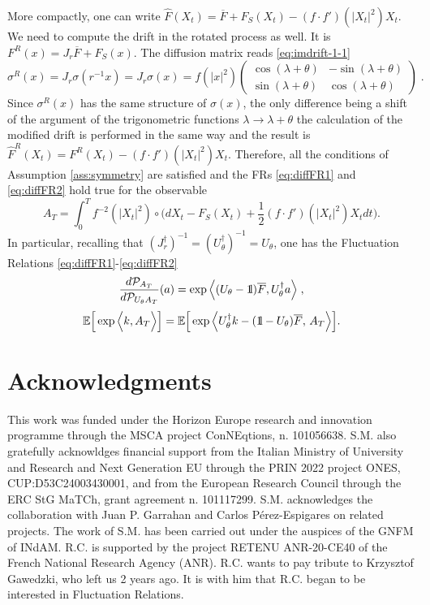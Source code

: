 \documentclass[a4paper,11pt]{article}
\numberwithin{equation}{section}
\newcommand{\bbbone}{\mathchoice {\rm 1\mskip-4mu l} {\rm 1\mskip-4mu l}
{\rm 1\mskip-4.5mu l} {\rm 1\mskip-5mu l}}
\begin{document}
More compactly, one can write $\widehat{F}(X_t) = \overline{F} + F_S(X_t) - \left(f\cdot f'\right) (|X_t|^2) X_t$. We need to compute the drift in the rotated process as well. It is $F^R(x)= J_r \overline{F} + F_S(x)$. The diffusion matrix reads \eqref{eq:imdrift-1-1}
$$\sigma^R(x)= J_r \sigma(r^{-1}x)= J_r \sigma(x) = f(|x|^2)
\begin{pmatrix}
\cos(\lambda +\theta)  &-\sin(\lambda + \theta) \\
\sin(\lambda + \theta)   & \cos(\lambda + \theta) 
\end{pmatrix} \;.
$$
Since $\sigma^R(x)$ has the same structure of $\sigma(x)$, the only difference being a shift of the argument of the trigonometric functions $\lambda \to \lambda+\theta$ the calculation of the modified drift is performed in the same way and the result is $\widehat{F}^R(X_t)= F^R(X_t) -\left(f\cdot f'\right) (|X_t|^2) X_t$. Therefore, all the conditions of Assumption \ref{ass:symmetry} are satisfied and the FRs \eqref{eq:diffFR1} and \eqref{eq:diffFR2} hold true for the observable 
$$A_T = \int_{0}^{T}  f^{-2}(|X_{t}|^2)\circ \Big(dX_{t} - F_S(X_t) + \frac{1}{2} \left(f\cdot f'\right) (|X_t|^2) X_t dt \Big). $$ In particular, recalling that $(J_r^\dag)^{-1}= (U_\theta^\dag)^{-1}= U_\theta$, one has the Fluctuation Relations \eqref{eq:diffFR1}-\eqref{eq:diffFR2}
\begin{equation}
\frac{d\mathcal{P}_{A_T}}{d\mathcal{P}_{U_\theta A_T}}(a)=\exp \Big\langle (U_\theta - \bbbone)\overline{F},U_\theta^\dag a \Big\rangle  \; ,
\end{equation}
\begin{equation}
\mathbb{E}\Big[\exp\Big\langle k,A_T\Big\rangle \Big]=\mathbb{E}\Big[\exp \Big\langle U_\theta^\dag k -
(\bbbone-U_\theta)\overline{F}, \,A_T\Big\rangle \Big] .
\end{equation}








\section*{Acknowledgments}

This work was funded under the Horizon Europe research and innovation programme through the MSCA project ConNEqtions, n. 101056638.  S.M.  also gratefully acknowldges financial support from the Italian Ministry of University and Research and Next Generation EU through the PRIN 2022 project ONES,  CUP:D53C24003430001,  and from the European Research Council through the ERC StG MaTCh,  grant agreement n. 101117299.
S.M. acknowledges the collaboration with Juan P. Garrahan and Carlos P\'erez-Espigares on related projects. The work of S.M. has been carried out under the auspices of the GNFM of INdAM. 
R.C. is supported by the project RETENU ANR-20-CE40 of the French National Research Agency (ANR). 
R.C. wants to pay tribute to Krzysztof Gawedzki, who left us 2 years ago. It is with him that R.C. began to be interested in Fluctuation Relations. 
\end{document}
